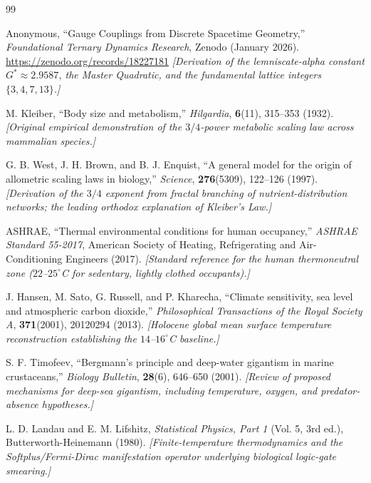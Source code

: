 \documentclass[11pt, letterpaper]{article}
\newcommand{\G}{G^*}
\theoremstyle{definition}
\theoremstyle{remark}
\begin{document}
\begin{thebibliography}{99}

Anonymous,
``Gauge Couplings from Discrete Spacetime Geometry,''
\textit{Foundational Ternary Dynamics Research}, Zenodo (January 2026).
\url{https://zenodo.org/records/18227181}
\newblock \textit{[Derivation of the lemniscate-alpha constant $\G \approx 2.9587$, the Master Quadratic, and the fundamental lattice integers $\{3, 4, 7, 13\}$.]}

M. Kleiber,
``Body size and metabolism,''
\textit{Hilgardia}, \textbf{6}(11), 315--353 (1932).
\newblock \textit{[Original empirical demonstration of the $3/4$-power metabolic scaling law across mammalian species.]}

G. B. West, J. H. Brown, and B. J. Enquist,
``A general model for the origin of allometric scaling laws in biology,''
\textit{Science}, \textbf{276}(5309), 122--126 (1997).
\newblock \textit{[Derivation of the $3/4$ exponent from fractal branching of nutrient-distribution networks; the leading orthodox explanation of Kleiber's Law.]}

ASHRAE,
``Thermal environmental conditions for human occupancy,''
\textit{ASHRAE Standard 55-2017}, American Society of Heating, Refrigerating and Air-Conditioning Engineers (2017).
\newblock \textit{[Standard reference for the human thermoneutral zone ($22$--$25^\circ$C for sedentary, lightly clothed occupants).]}

J. Hansen, M. Sato, G. Russell, and P. Kharecha,
``Climate sensitivity, sea level and atmospheric carbon dioxide,''
\textit{Philosophical Transactions of the Royal Society A}, \textbf{371}(2001), 20120294 (2013).
\newblock \textit{[Holocene global mean surface temperature reconstruction establishing the $14$--$16^\circ$C baseline.]}

S. F. Timofeev,
``Bergmann's principle and deep-water gigantism in marine crustaceans,''
\textit{Biology Bulletin}, \textbf{28}(6), 646--650 (2001).
\newblock \textit{[Review of proposed mechanisms for deep-sea gigantism, including temperature, oxygen, and predator-absence hypotheses.]}

L. D. Landau and E. M. Lifshitz,
\textit{Statistical Physics, Part 1} (Vol. 5, 3rd ed.), Butterworth-Heinemann (1980).
\newblock \textit{[Finite-temperature thermodynamics and the Softplus/Fermi-Dirac manifestation operator underlying biological logic-gate smearing.]}

\end{thebibliography}
\end{document}
